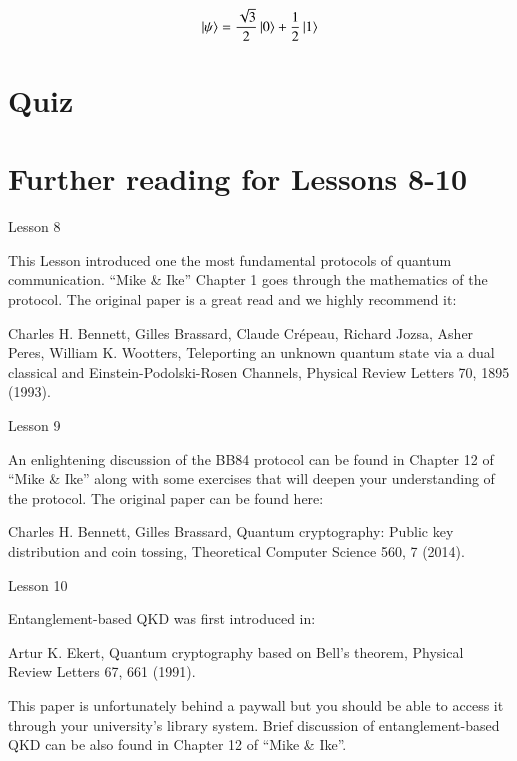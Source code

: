 \newpage
\begin{exercises}
\begin{equation*}
\ket{\psi} = \frac{\sqrt{3}}{2}\ket{0} + \frac{1}{2}\ket{1}
\end{equation*}


\end{exercises}

\newpage
\section{Quiz}


\section{Further reading for Lessons 8-10}

Lesson 8

This Lesson introduced one the most fundamental protocols of quantum communication. “Mike \& Ike” Chapter 1 goes through the mathematics of the protocol. The original paper is a great read and we highly recommend it:

Charles H. Bennett, Gilles Brassard, Claude Crépeau, Richard Jozsa, Asher Peres, William K. Wootters, Teleporting an unknown quantum state via a dual classical and Einstein-Podolski-Rosen Channels, Physical Review Letters 70, 1895 (1993).

Lesson 9

An enlightening discussion of the BB84 protocol can be found in Chapter 12 of “Mike \& Ike” along with some exercises that will deepen your understanding of the protocol.
The original paper can be found here:

Charles H. Bennett, Gilles Brassard, Quantum cryptography: Public key distribution and coin tossing, Theoretical Computer Science 560, 7 (2014).

Lesson 10

Entanglement-based QKD was first introduced in:

Artur K. Ekert, Quantum cryptography based on Bell’s theorem, Physical Review Letters 67, 661 (1991).

This paper is unfortunately behind a paywall but you should be able to access it through your university’s library system.
Brief discussion of entanglement-based QKD can be also found in Chapter 12 of “Mike \& Ike”.
